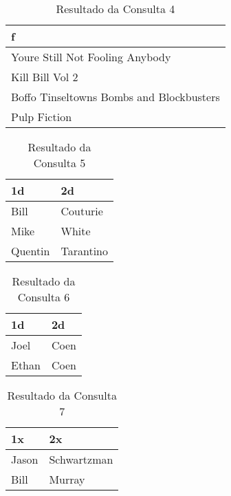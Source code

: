\documentclass{article}
\begin{document}
\begin{table}[htbp]
\begin{center}
\begin{tabular}{l}

\textbf{f} \\ 
\midrule
Youre Still Not Fooling Anybody \\ 
Kill Bill Vol 2 \\ 
Boffo Tinseltowns Bombs and Blockbusters \\ 
Pulp Fiction \\ 
\end{tabular}
\end{center}
\caption{Resultado da Consulta 4}

\end{table}

\begin{table}[htbp]
\begin{center}
\begin{tabular}{ll}

\textbf{1d} & \textbf{2d} \\ 
\midrule
Bill & Couturie \\ 
Mike & White \\ 
Quentin & Tarantino \\ 
\end{tabular}
\end{center}
\caption{Resultado da Consulta 5}

\end{table}

\begin{table}[htbp]
\begin{center}
\begin{tabular}{ll}

\textbf{1d} & \textbf{2d} \\ 
\midrule
Joel & Coen \\ 
Ethan & Coen   \\ 
\end{tabular}
\end{center}
\caption{Resultado da Consulta 6}

\end{table}

\begin{table}[htbp]
\begin{center}
\begin{tabular}{ll}

\textbf{1x} & \textbf{2x} \\ 
\midrule
Jason & Schwartzman \\ 
Bill & Murray  \\ 
\end{tabular}
\end{center}
\caption{Resultado da Consulta 7}

\end{table}
\end{document}
